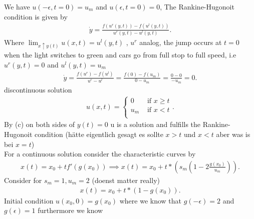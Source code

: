 \begin{solution}
  We have $u(-\epsilon ,t=0) = u_m$  and $u(\epsilon,t=0) = 0 $, 
  The Rankine-Hugonoit condition is given by 
  \begin{align*}
  \dot{y} = \frac{f(u^{r}(y,t) )-f(u^{l}(y,t) )}{u^{r}(y,t) - u^{l}(y,t)  } 
  .\end{align*}
  Where $\lim_{x \uparrow y(t)} u(x,t) =  u^{l}(y,t) $ , $u^{r} $ analog, the jump occurs  at $t=0$ when the light 
  switches to green and cars go from full stop to full speed, i.e $u^{r}(y,t)=0 $ and  $u^{l}(y,t)=u_m $
  \begin{align*}
    \dot{y} = \frac{f(u^{r} ) - f(u^{l} )}{u^{r} - u^{l}  }  = \frac{f(0)-f(u_m)}{0-u_m} = \frac{0 - 0}{-u_m} = 0
  .\end{align*}
  discontinuous solution 
  \begin{align*}
    u(x,t) = \begin{cases}
      0 &\text{ if } x\ge t \\
      u_m &\text{ if } x<t\\
    \end{cases}
  .\end{align*}
  By (c) on both sides of $y(t) = 0$ u is a solution and fulfills the Rankine-Hugonoit condition (hätte eigentlich gesagt es sollte $x>t$ und $x<t$ aber was is bei $x=t$)\\[1ex]
  For a continuous solution consider the characteristic curves by 
  \begin{align*}
    x(t) = x_{0} + t f'(g(x_{0})) \implies x(t) = x_{0} + t*(s_m(1-2 \frac{g(x_{0})}{u_m}))
  .\end{align*}
  Consider for $s_m = 1 , u_m = 2$ (doenst matter really)
  \begin{align*}
   x(t) = x_{0} + t*(1-g(x_{0})) 
  .\end{align*}
  Initial condition $u(x_{0},0) = g(x_{0})$ where we know that $g(-\epsilon ) = 2$ and $g(\epsilon ) = 1$ furthermore we know 

\end{solution}

